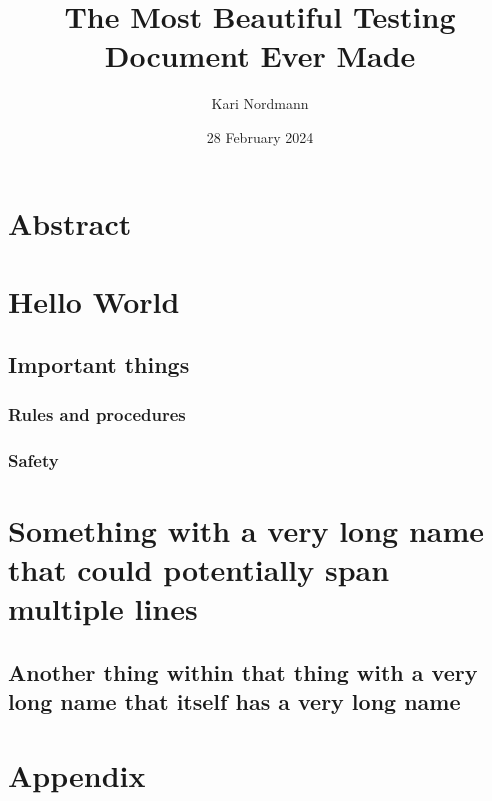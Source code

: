 \documentclass[sansheadings]{ooga-booga}
\title{The Most Beautiful Testing Document Ever Made}
\author{Kari Nordmann}
\date{28 February 2024}
\begin{document}
\frontmatter

\maketitle

\chapter{Abstract}

\lipsum[40-41]

\tableofcontents

\mainmatter

\chapter{Hello World}

\lipsum[1-2]

\section{Important things}

\subsection{Rules and procedures}

\lipsum[3-8]

\subsection{Safety}

\lipsum[9-12]

\chapter{Something with a very long name that could potentially span multiple lines}

\section{Another thing within that thing with a very long name that itself has a very long name}

\lipsum[13-15]

\backmatter

\chapter{Appendix}

\lipsum[20-22]
\end{document}
